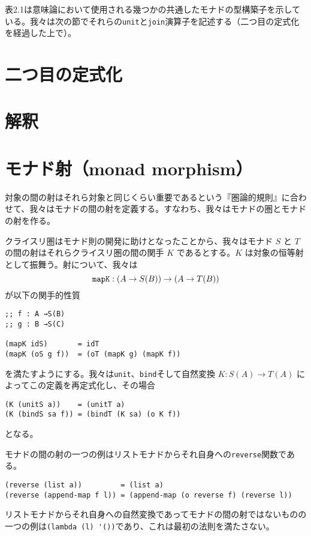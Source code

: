 \documentclass[11pt, oneside]{jsbook}   	%
\begin{document}
表2.1は意味論において使用される幾つかの共通したモナドの型構築子を示している。我々は次の節でそれらの\verb|unit|と\verb|join|演算子を記述する（二つ目の定式化を経過した上で）。
\section{ 二つ目の定式化 }
\section{ 解釈 }

\newpage

\newpage

\newpage

\section{ モナド射（monad morphism） }
対象の間の射はそれら対象と同じくらい重要であるという『圏論的規則』に合わせて、我々はモナドの間の射を定義する。すなわち、我々はモナドの圏とモナドの射を作る。

クライスリ圏はモナド則の開発に助けとなったことから、我々はモナド $S$ と $T$ の間の射はそれらクライスリ圏の間の関手 $K$ であるとする。$K$ は対象の恒等射として振舞う。射について、我々は
$$
\verb|mapK| : (A \rightarrow S(B)) \rightarrow (A \rightarrow T(B))
$$
が以下の関手的性質
\begin{lstlisting}
;; f : A →S(B)
;; g : B →S(C)

(mapK idS)       = idT   
(mapK (oS g f))  = (oT (mapK g) (mapK f))
\end{lstlisting}
を満たすようにする。我々は\verb|unit|、\verb|bind|そして自然変換 $K : S(A) \rightarrow T(A)$ によってこの定義を再定式化し、その場合
\begin{lstlisting}
(K (unitS a))    = (unitT a)
(K (bindS sa f)) = (bindT (K sa) (o K f))
\end{lstlisting}
となる。

モナドの間の射の一つの例はリストモナドからそれ自身への\verb|reverse|関数である。
\begin{lstlisting}
(reverse (list a))         = (list a)
(reverse (append-map f l)) = (append-map (o reverse f) (reverse l))
\end{lstlisting}
リストモナドからそれ自身への自然変換であってモナドの間の射ではないものの一つの例は\verb|(lambda (l) '())|であり、これは最初の法則を満たさない。
\end{document}
